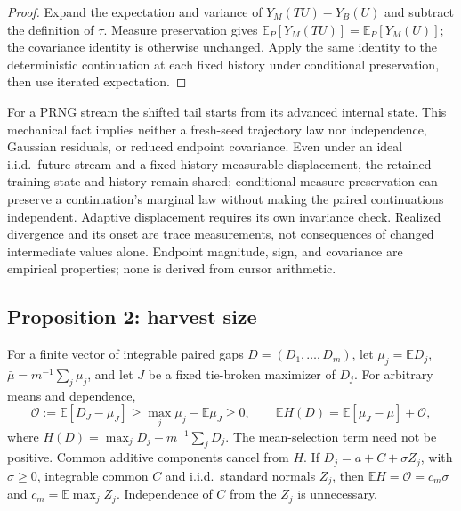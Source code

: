 \begin{proof}
Expand the expectation and variance of $Y_M(TU)-Y_B(U)$ and subtract the
definition of $\tau$. Measure preservation gives
$\mathbb E_P[Y_M(TU)]=\mathbb E_P[Y_M(U)]$; the covariance identity is
otherwise unchanged. Apply the same identity to the deterministic continuation
at each fixed history under conditional preservation, then use iterated
expectation.
\end{proof}

\begin{remarkx}
For a PRNG stream the shifted tail starts from its advanced internal state.
This mechanical fact implies neither a fresh-seed trajectory law nor
independence, Gaussian residuals, or reduced endpoint covariance. Even under
an ideal i.i.d.\ future stream and a fixed history-measurable displacement,
the retained training state and history remain shared; conditional
measure preservation can preserve a continuation's marginal law without
making the paired continuations independent. Adaptive displacement requires
its own invariance check. Realized divergence and its onset are trace
measurements, not consequences of changed intermediate values alone.
Endpoint magnitude, sign, and covariance are empirical properties; none is
derived from cursor arithmetic.
\end{remarkx}

\subsection{Proposition 2: harvest size}

\begin{propositionx}

For a finite vector of integrable paired gaps $D=(D_1,\ldots,D_m)$, let
$\mu_j=\mathbb ED_j$, $\bar\mu=m^{-1}\sum_j\mu_j$, and let $J$ be a fixed
tie-broken maximizer of $D_j$. For arbitrary means and dependence,
\[
\mathcal O:=\mathbb E[D_J-\mu_J]
\ge\max_j\mu_j-\mathbb E\mu_J\ge0,\qquad
\mathbb EH(D)=\mathbb E[\mu_J-\bar\mu]+\mathcal O,
\]
where $H(D)=\max_jD_j-m^{-1}\sum_jD_j$. The mean-selection term need not be
positive. Common additive components cancel from $H$.
If $D_j=a+C+\sigma Z_j$, with $\sigma\ge0$, integrable common $C$ and i.i.d.\ standard
normals $Z_j$, then $\mathbb EH=\mathcal O=c_m\sigma$ and
$c_m=\mathbb E\max_jZ_j$. Independence of $C$ from the $Z_j$ is unnecessary.
\end{propositionx}


